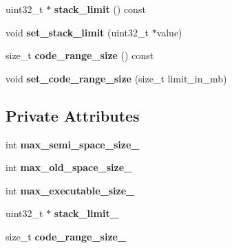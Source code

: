 \begin{DoxyCompactItemize}
\item 
uint32\+\_\+t $\ast$ {\bfseries stack\+\_\+limit} () const \hypertarget{classv8_1_1_resource_constraints_aafc4a94f2eeb0684e7a50f355eb4d06d}{}\label{classv8_1_1_resource_constraints_aafc4a94f2eeb0684e7a50f355eb4d06d}

\item 
void {\bfseries set\+\_\+stack\+\_\+limit} (uint32\+\_\+t $\ast$value)\hypertarget{classv8_1_1_resource_constraints_a26ed3e89985a4afe34e84509fb093cf1}{}\label{classv8_1_1_resource_constraints_a26ed3e89985a4afe34e84509fb093cf1}

\item 
size\+\_\+t {\bfseries code\+\_\+range\+\_\+size} () const \hypertarget{classv8_1_1_resource_constraints_a8dd511917ad17bf2185d574b0c7e4186}{}\label{classv8_1_1_resource_constraints_a8dd511917ad17bf2185d574b0c7e4186}

\item 
void {\bfseries set\+\_\+code\+\_\+range\+\_\+size} (size\+\_\+t limit\+\_\+in\+\_\+mb)\hypertarget{classv8_1_1_resource_constraints_adeab824b969292881098b66164ab9e13}{}\label{classv8_1_1_resource_constraints_adeab824b969292881098b66164ab9e13}

\end{DoxyCompactItemize}
\subsection*{Private Attributes}
\begin{DoxyCompactItemize}
\item 
int {\bfseries max\+\_\+semi\+\_\+space\+\_\+size\+\_\+}\hypertarget{classv8_1_1_resource_constraints_a86c60a00594dc8fbd5944b6828b2d6c8}{}\label{classv8_1_1_resource_constraints_a86c60a00594dc8fbd5944b6828b2d6c8}

\item 
int {\bfseries max\+\_\+old\+\_\+space\+\_\+size\+\_\+}\hypertarget{classv8_1_1_resource_constraints_ada39b1b3247ba65aa93ee9b6c8f4d92c}{}\label{classv8_1_1_resource_constraints_ada39b1b3247ba65aa93ee9b6c8f4d92c}

\item 
int {\bfseries max\+\_\+executable\+\_\+size\+\_\+}\hypertarget{classv8_1_1_resource_constraints_aa796ecd10206ccdcd38cde3087383ef4}{}\label{classv8_1_1_resource_constraints_aa796ecd10206ccdcd38cde3087383ef4}

\item 
uint32\+\_\+t $\ast$ {\bfseries stack\+\_\+limit\+\_\+}\hypertarget{classv8_1_1_resource_constraints_a0b2084c6e0c3f857410d0f9326d7c5af}{}\label{classv8_1_1_resource_constraints_a0b2084c6e0c3f857410d0f9326d7c5af}

\item 
size\+\_\+t {\bfseries code\+\_\+range\+\_\+size\+\_\+}\hypertarget{classv8_1_1_resource_constraints_ada688048046ed92c3efa99169541b8e3}{}\label{classv8_1_1_resource_constraints_ada688048046ed92c3efa99169541b8e3}

\end{DoxyCompactItemize}


